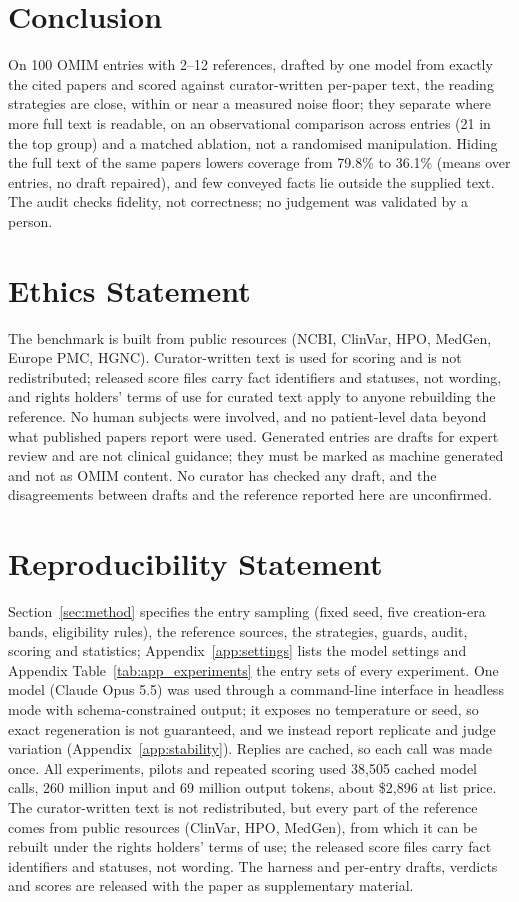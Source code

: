 \documentclass{article} %
\begin{document}
\section{Conclusion}
\label{sec:conclusion}
On 100 OMIM entries with 2--12 references, drafted by one model from exactly the cited papers and scored against curator-written per-paper text, the reading strategies are close, within or near a measured noise floor; they separate where more full text is readable, on an observational comparison across entries (21 in the top group) and a matched ablation, not a randomised manipulation. Hiding the full text of the same papers lowers coverage from 79.8\% to 36.1\% (means over entries, no draft repaired), and few conveyed facts lie outside the supplied text. The audit checks fidelity, not correctness; no judgement was validated by a person.

\section*{Ethics Statement}
The benchmark is built from public resources (NCBI, ClinVar, HPO, MedGen, Europe PMC, HGNC). Curator-written text is used for scoring and is not redistributed; released score files carry fact identifiers and statuses, not wording, and rights holders' terms of use for curated text apply to anyone rebuilding the reference. No human subjects were involved, and no patient-level data beyond what published papers report were used. Generated entries are drafts for expert review and are not clinical guidance; they must be marked as machine generated and not as OMIM content. No curator has checked any draft, and the disagreements between drafts and the reference reported here are unconfirmed.

\section*{Reproducibility Statement}
Section~\ref{sec:method} specifies the entry sampling (fixed seed, five creation-era bands, eligibility rules), the reference sources, the strategies, guards, audit, scoring and statistics; Appendix~\ref{app:settings} lists the model settings and Appendix Table~\ref{tab:app_experiments} the entry sets of every experiment. One model (Claude Opus 5.5) was used through a command-line interface in headless mode with schema-constrained output; it exposes no temperature or seed, so exact regeneration is not guaranteed, and we instead report replicate and judge variation (Appendix~\ref{app:stability}). Replies are cached, so each call was made once. All experiments, pilots and repeated scoring used 38,505 cached model calls, 260 million input and 69 million output tokens, about \$2,896 at list price. The curator-written text is not redistributed, but every part of the reference comes from public resources (ClinVar, HPO, MedGen), from which it can be rebuilt under the rights holders' terms of use; the released score files carry fact identifiers and statuses, not wording. The harness and per-entry drafts, verdicts and scores are released with the paper as supplementary material.
\end{document}

